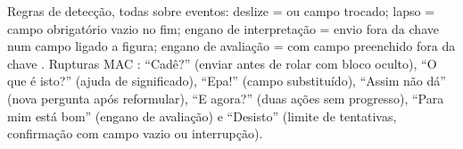 Regras de detecção, todas sobre eventos: deslize =  ou campo trocado; lapso = campo obrigatório vazio no fim; engano de interpretação = envio fora da chave num campo ligado a figura; engano de avaliação =  com campo preenchido fora da chave \cite{reason1990}. Rupturas MAC \cite{desouza2009}: ``Cadê?'' (enviar antes de rolar com bloco oculto), ``O que é isto?'' (ajuda de significado), ``Epa!'' (campo substituído), ``Assim não dá'' (nova pergunta após reformular), ``E agora?'' (duas ações sem progresso), ``Para mim está bom'' (engano de avaliação) e ``Desisto'' (limite de tentativas, confirmação com campo vazio ou interrupção).
